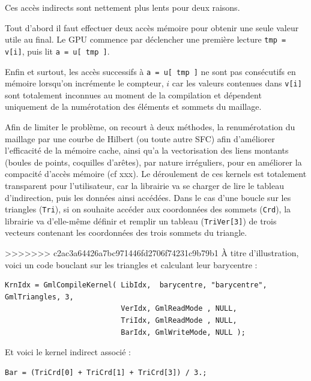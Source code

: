 \documentclass[a4paper,12pt]{article}
\begin{document}
Ces accès indirects sont nettement plus lents pour deux raisons.

Tout d'abord il faut effectuer deux accès mémoire pour obtenir une seule valeur utile au final.
Le GPU commence par déclencher une première lecture {\tt tmp = v[i]}, puis lit {\tt a = u[ tmp ]}.

Enfin et surtout, les accès successifs à {\tt a = u[ tmp ]} ne sont pas consécutifs en mémoire lorsqu'on incrémente le compteur, $i$ car les valeurs contenues dans {\tt v[i]} sont totalement inconnues au moment de la compilation et dépendent uniquement de la numérotation des éléments et sommets du maillage.

Afin de limiter le problème, on recourt à deux méthodes, la renumérotation du maillage par une courbe de Hilbert (ou toute autre SFC) afin d'améliorer l'efficacité de la mémoire cache, ainsi qu'a la vectorisation des liens montants (boules de points, coquilles d'arêtes), par nature irréguliers, pour en améliorer la compacité d'accès mémoire (cf xxx).
Le déroulement de ces kernels est totalement transparent pour l'utilisateur, car la librairie va se charger de lire le tableau d'indirection, puis les données ainsi accédées.
Dans le cas d'une boucle sur les triangles ({\tt Tri}), si on souhaite accéder aux coordonnées des sommets ({\tt Crd}), la librairie va d'elle-même définir et remplir un tableau ({\tt TriVer[3]}) de trois vecteurs contenant les coordonnées des trois sommets du triangle.

>>>>>>> c2ac3a64426a7bc971446fd2706f74231c9b79b1
À titre d'illustration, voici un code bouclant sur les triangles et calculant leur barycentre :

\begin{tt}
\begin{verbatim}
KrnIdx = GmlCompileKernel( LibIdx,  barycentre, "barycentre", GmlTriangles, 3,
                           VerIdx, GmlReadMode , NULL,
                           TriIdx, GmlReadMode , NULL,
                           BarIdx, GmlWriteMode, NULL );
\end{verbatim}
\end{tt}
\normalfont

Et voici le kernel indirect associé :

\begin{tt}
\begin{verbatim}
Bar = (TriCrd[0] + TriCrd[1] + TriCrd[3]) / 3.;
\end{verbatim}
\end{tt}
\normalfont
\end{document}
